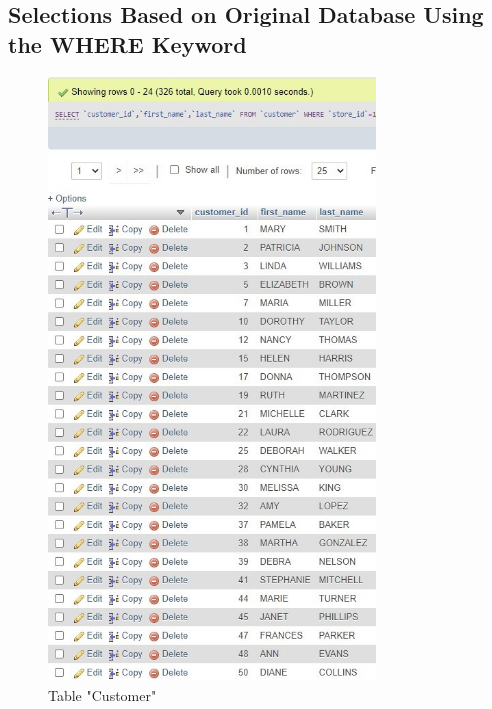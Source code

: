 \documentclass[openany]{article}
\begin{document}
\subsection{Selections Based on Original Database Using the WHERE Keyword} 
		\begin{figure}[H]
			\includegraphics[height = 16cm]{customer_selectwhere}
			\caption{Table "Customer"}
		\end{figure}
\end{document}
